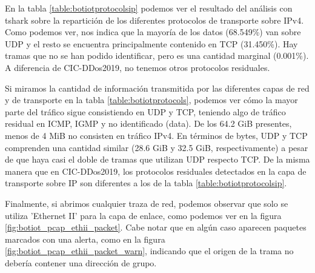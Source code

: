 En la tabla \ref{table:botiotprotocolsip} podemos ver el resultado del análisis con tshark sobre la repartición de los diferentes protocolos de transporte sobre IPv4. Como podemos ver, nos indica que la mayoría de los datos (68.549\%) van sobre UDP y el resto se encuentra principalmente contenido en TCP (31.450\%). Hay tramas que no se han podido identificar, pero es una cantidad marginal (0.001\%). A diferencia de CIC-DDos2019, no tenemos otros protocolos residuales.



Si miramos la cantidad de información transmitida por las diferentes capas de red y de transporte en la tabla \ref{table:botiotprotocols}, podemos ver cómo la mayor parte del tráfico sigue consistiendo en UDP y TCP, teniendo algo de tráfico residual en ICMP, IGMP y no identificado (data). De los 64.2 GiB presentes, menos de 4 MiB no consisten en tráfico IPv4. En términos de bytes, UDP y TCP comprenden una cantidad similar (28.6 GiB y 32.5 GiB, respectivamente) a pesar de que haya casi el doble de tramas que utilizan UDP respecto TCP. De la misma manera que en CIC-DDos2019, los protocolos residuales detectados en la capa de transporte sobre IP son diferentes a los de la tabla \ref{table:botiotprotocolsip}.



Finalmente, si abrimos cualquier traza de red, podemos observar que solo se utiliza 'Ethernet II' para la capa de enlace, como podemos ver en la figura \ref{fig:botiot_pcap_ethii_packet}. Cabe notar que en algún caso aparecen paquetes marcados con una alerta, como en la figura \ref{fig:botiot_pcap_ethii_packet_warn}, indicando que el origen de la trama no debería contener una dirección de grupo.

